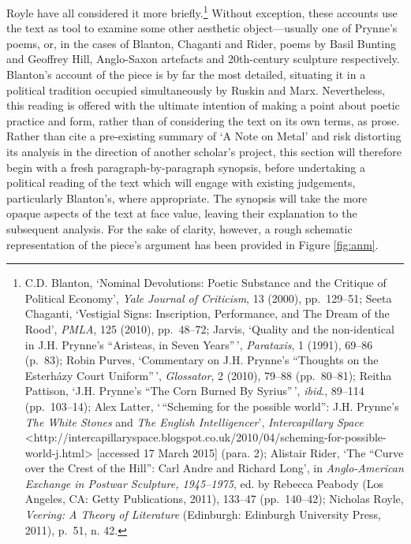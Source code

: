 \documentclass[]{article}
\begin{document}
Royle have all considered it more briefly.\footnote{C.D. Blanton,
  `Nominal Devolutions: Poetic Substance and the Critique of Political
  Economy', \emph{Yale Journal of Criticism}, 13 (2000), pp.~129--51;
  Seeta Chaganti, `Vestigial Signs: Inscription, Performance, and The
  Dream of the Rood', \emph{PMLA}, 125 (2010), pp.~48--72; Jarvis,
  `Quality and the non-identical in J.H. Prynne's ``Aristeas, in Seven
  Years''\,', \emph{Parataxis}, 1 (1991), 69--86 (p.~83); Robin Purves,
  `Commentary on J.H. Prynne's ``Thoughts on the Esterházy Court
  Uniform''\,', \emph{Glossator}, 2 (2010), 79--88 (pp.~80--81); Reitha
  Pattison, `J.H. Prynne's ``The Corn Burned By Syrius''\,',
  \emph{ibid}., 89--114 (pp.~103--14); Alex Latter, `\,``Scheming for
  the possible world'': J.H. Prynne's \emph{The White Stones} and
  \emph{The English Intelligencer}', \emph{Intercapillary Space}
  \textless{}http://intercapillaryspace.blogspot.co.uk/2010/04/scheming-for-possible-world-j.html\textgreater{}
  {[}accessed 17 March 2015{]} (para. 2); Alistair Rider, `The ``Curve
  over the Crest of the Hill'': Carl Andre and Richard Long', in
  \emph{Anglo-American Exchange in Postwar Sculpture, 1945--1975}, ed.
  by Rebecca Peabody (Los Angeles, CA: Getty Publications, 2011),
  133--47 (pp.~140--42); Nicholas Royle, \emph{Veering: A Theory of
  Literature} (Edinburgh: Edinburgh University Press, 2011), p.~51, n.
  42.} Without exception, these accounts use the text as tool to examine
some other aesthetic object---usually one of Prynne's poems, or, in the
cases of Blanton, Chaganti and Rider, poems by Basil Bunting and
Geoffrey Hill, Anglo-Saxon artefacts and 20th-century sculpture
respectively. Blanton's account of the piece is by far the most
detailed, situating it in a political tradition occupied simultaneously
by Ruskin and Marx. Nevertheless, this reading is offered with the
ultimate intention of making a point about poetic practice and form,
rather than of considering the text on its own terms, as prose. Rather
than cite a pre-existing summary of `A Note on Metal' and risk
distorting its analysis in the direction of another scholar's project,
this section will therefore begin with a fresh paragraph-by-paragraph
synopsis, before undertaking a political reading of the text which will
engage with existing judgements, particularly Blanton's, where
appropriate. The synopsis will take the more opaque aspects of the text
at face value, leaving their explanation to the subsequent analysis. For
the sake of clarity, however, a rough schematic representation of the
piece's argument has been provided in Figure \ref{fig:anm}.
\end{document}
